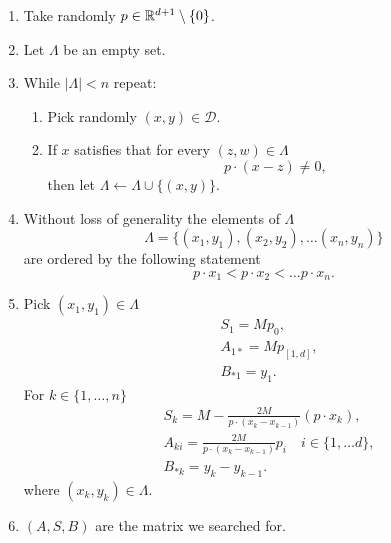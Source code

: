  \begin{enumerate}
    \item Take randomly $p \in \mathbb{R}^{d+1} \setminus \{0\}$.
    \item Let $\Lambda$ be an empty set. 
    \item While $|\Lambda| < n$ repeat:
    \begin{enumerate}[label=\roman*.]
        \item Pick randomly $(x,y) \in \mathcal{D}$.
        \item If $x$ satisfies that for every $(z,w) \in \Lambda$
        \begin{equation}
            p \cdot (x - z) \neq 0,
        \end{equation}
        then let $\Lambda \gets \Lambda \cup \{(x,y)\}$.
    \end{enumerate}
    \item Without loss of generality the elements of $\Lambda$
    \begin{equation*}
        \Lambda = \{(x_1,y_1), (x_2,y_2), \ldots (x_n, y_n)\}
    \end{equation*}
    are ordered by the following statement
    \begin{equation}
        p \cdot x_1 < p \cdot x_2< \ldots p \cdot x_n.
    \end{equation}
    \item Pick  $(x_1, y_1) \in \Lambda$ \\
    \begin{align*}
         &S_1 = M p_0, \\
         & A_{1 *} = M p_{[1,d]}, \\
         & B_{* 1} = y_1.
     \end{align*}
    For $k \in \{1, \ldots, n \}$
     \begin{align*}
         &S_{k} = M -  \frac{2 M}{p \cdot (x_k - x_{k-1})}(p \cdot x_{k}),\\
         & A_{k i} = \frac{2 M}{p \cdot (x_k - x_{k-1})}
         p_{i}  \quad i \in \{1, \ldots d\},\\
         & B_{* k} = y_k - y_{k-1}.
     \end{align*} 
     where $(x_k, y_k) \in \Lambda$.
     
     \item $(A,S,B)$ are the matrix we searched for.
    
 \end{enumerate}
